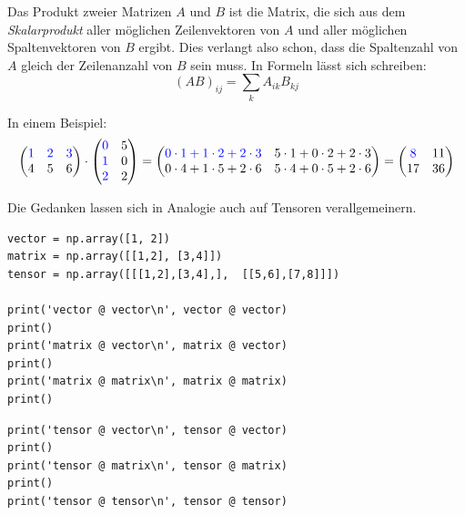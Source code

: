 \begin{hintbox}[Matrixprodukt]
Das Produkt zweier Matrizen $A$ und $B$ ist die Matrix, die sich aus dem \emph{Skalarprodukt} aller möglichen Zeilenvektoren von $A$ und aller möglichen Spaltenvektoren von $B$ ergibt. Dies verlangt also schon, dass die Spaltenzahl von $A$ gleich der Zeilenanzahl von $B$ sein muss. In Formeln lässt sich schreiben:
\[ (AB)_{ij} = \sum_k A_{ik} B_{kj} \]

In einem Beispiel:
\begin{align*}
	\begin{pmatrix}
		\color{blue} 1 & \color{blue} 2 & \color{blue} 3 \\
		             4 &              5 &              6
	\end{pmatrix}
\cdot
	\begin{pmatrix}
		\color{blue} 0 & 5 \\
		\color{blue} 1 & 0 \\
		\color{blue} 2 & 2
	\end{pmatrix}
=
	\begin{pmatrix}
		\color{blue} 0 \cdot 1 + 1 \cdot 2 + 2 \cdot 3 &
		             5 \cdot 1 + 0 \cdot 2 + 2 \cdot 3
		\\
		             0 \cdot 4 + 1 \cdot 5 + 2 \cdot 6 &
                 5 \cdot 4 + 0 \cdot 5 + 2 \cdot 6
	\end{pmatrix}
=
	\begin{pmatrix}
		\color{blue}  8 & 11 \\
		             17 & 36
	\end{pmatrix}
\end{align*}

Die Gedanken lassen sich in Analogie auch auf Tensoren verallgemeinern.
\end{hintbox}

\begin{codebox}
\begin{verbatim}
vector = np.array([1, 2])
matrix = np.array([[1,2], [3,4]])
tensor = np.array([[[1,2],[3,4],],  [[5,6],[7,8]]])

print('vector @ vector\n', vector @ vector)
print()
print('matrix @ vector\n', matrix @ vector)
print()
print('matrix @ matrix\n', matrix @ matrix)
print()
\end{verbatim}
\end{codebox}

\begin{codebox}[]
\begin{verbatim}
print('tensor @ vector\n', tensor @ vector)
print()
print('tensor @ matrix\n', tensor @ matrix)
print()
print('tensor @ tensor\n', tensor @ tensor)
\end{verbatim}
\end{codebox}

